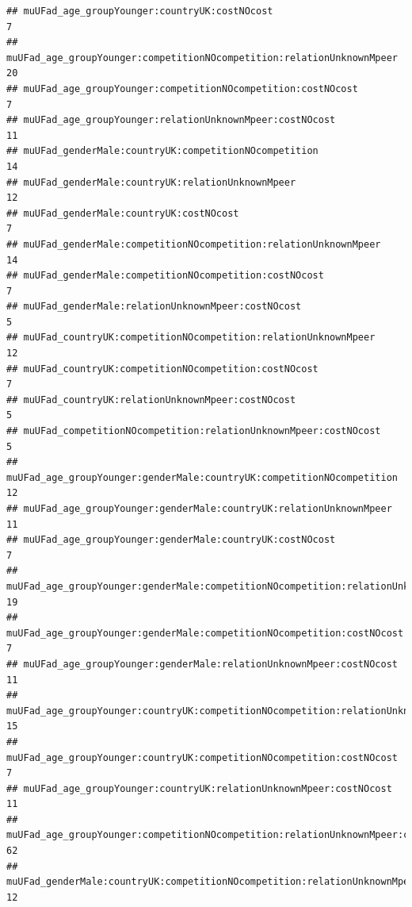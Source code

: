 \documentclass[
]{article}
\begin{document}
\begin{verbatim}
## muUFad_age_groupYounger:countryUK:costNOcost                                                        7
## muUFad_age_groupYounger:competitionNOcompetition:relationUnknownMpeer                              20
## muUFad_age_groupYounger:competitionNOcompetition:costNOcost                                         7
## muUFad_age_groupYounger:relationUnknownMpeer:costNOcost                                            11
## muUFad_genderMale:countryUK:competitionNOcompetition                                               14
## muUFad_genderMale:countryUK:relationUnknownMpeer                                                   12
## muUFad_genderMale:countryUK:costNOcost                                                              7
## muUFad_genderMale:competitionNOcompetition:relationUnknownMpeer                                    14
## muUFad_genderMale:competitionNOcompetition:costNOcost                                               7
## muUFad_genderMale:relationUnknownMpeer:costNOcost                                                   5
## muUFad_countryUK:competitionNOcompetition:relationUnknownMpeer                                     12
## muUFad_countryUK:competitionNOcompetition:costNOcost                                                7
## muUFad_countryUK:relationUnknownMpeer:costNOcost                                                    5
## muUFad_competitionNOcompetition:relationUnknownMpeer:costNOcost                                     5
## muUFad_age_groupYounger:genderMale:countryUK:competitionNOcompetition                              12
## muUFad_age_groupYounger:genderMale:countryUK:relationUnknownMpeer                                  11
## muUFad_age_groupYounger:genderMale:countryUK:costNOcost                                             7
## muUFad_age_groupYounger:genderMale:competitionNOcompetition:relationUnknownMpeer                   19
## muUFad_age_groupYounger:genderMale:competitionNOcompetition:costNOcost                              7
## muUFad_age_groupYounger:genderMale:relationUnknownMpeer:costNOcost                                 11
## muUFad_age_groupYounger:countryUK:competitionNOcompetition:relationUnknownMpeer                    15
## muUFad_age_groupYounger:countryUK:competitionNOcompetition:costNOcost                               7
## muUFad_age_groupYounger:countryUK:relationUnknownMpeer:costNOcost                                  11
## muUFad_age_groupYounger:competitionNOcompetition:relationUnknownMpeer:costNOcost                   62
## muUFad_genderMale:countryUK:competitionNOcompetition:relationUnknownMpeer                          12

\end{verbatim}
\end{document}
